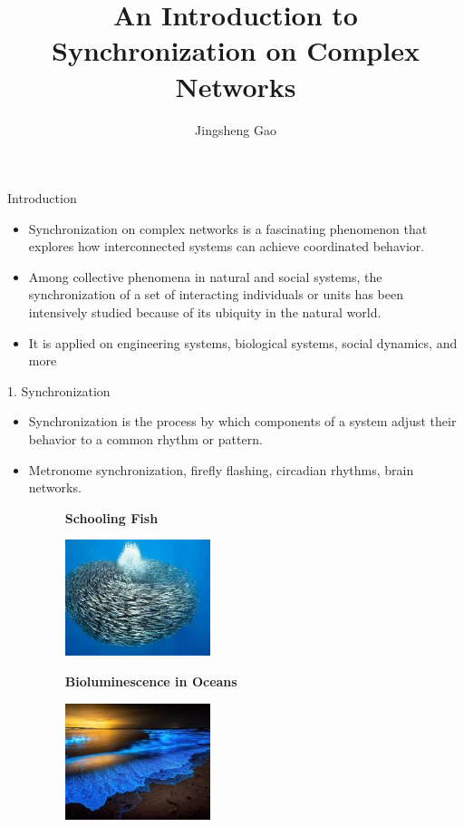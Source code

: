 \documentclass[
  notheorems,
  aspectratio=54,
]{beamer}
\title{An Introduction to Synchronization on Complex Networks}
\author{Jingsheng Gao}
\institute{Anqing Normal University}
\begin{document}
\begin{frame}
    \titlepage
\end{frame}

\begin{frame}{Introduction}
 \begin{itemize}
    \item Synchronization on complex networks is a fascinating phenomenon that explores how interconnected systems can achieve coordinated behavior.
    \item Among collective phenomena in natural and social systems, the synchronization of a set of interacting individuals or units has been intensively studied because of its ubiquity in the natural world.
    \item It is applied on engineering systems, biological systems, social dynamics, and more
  \end{itemize}
\end{frame}

\begin{frame}{1. Synchronization}
  \begin{figure}
    \centering
  \end{figure}
  \begin{itemize}
    \item Synchronization is the process by which components of a system adjust their behavior to a common rhythm or pattern.
    \item Metronome synchronization, firefly flashing, circadian rhythms, brain networks.
\begin{figure}
  \begin{minipage}[b]{0.45\textwidth}
    \textbf{Schooling Fish}\par\medskip
    \includegraphics[width=0.4\textwidth]{schooling_fish.png}
  \end{minipage}
  \hfill
  \begin{minipage}[b]{0.45\textwidth}
    \textbf{Bioluminescence in Oceans}\par\medskip
    \includegraphics[width=0.4\textwidth]{bioluminescence.png}
  \end{minipage}
\end{figure}
  \end{itemize}
\end{frame}
\end{document}
